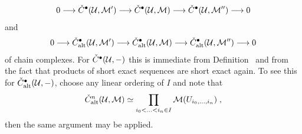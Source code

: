 \documentclass[a4paper,parskip=half,numbers=enddot, DIV=12]{scrreprt}
\begin{document}
\begin{align*}
	0\morphism \check{C}^\bullet (\Uu,\Mm')\morphism \check{C}^\bullet (\Uu,\Mm)\morphism \check{C}^\bullet (\Uu,\Mm'')\morphism 0
\end{align*}
and
\begin{align*}
	0\morphism \check{C}_\alt^\bullet (\Uu,\Mm')\morphism \check{C}_\alt^\bullet (\Uu,\Mm)\morphism \check{C}_\alt^\bullet (\Uu,\Mm'')\morphism 0
\end{align*}
of chain complexes. For $\check{C}^\bullet (\mathcal{U},-)$ this is immediate from Definition~ and from the fact that products of short exact sequences are short exact again. To see this for $\check{C}_{\mathrm{alt}}^\bullet (\mathcal{U},-)$, choose any linear ordering of $I$ and note that 
\begin{align*}
	\check{C}_{\mathrm{alt}}^n(\mathcal{U},\mathcal{M})\simeq\prod_{i_0<\ldots<i_n\in I}\mathcal{M}(U_{i_0,\ldots,i_n})\;,
\end{align*}
then the same argument may be applied.
\end{document}
